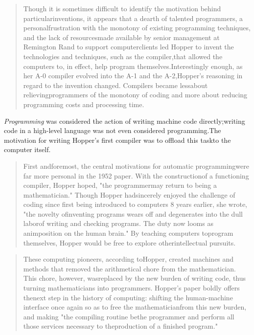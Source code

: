 \begin{quotation}
	Though it is sometimes difficult to identify the motivation behind
	particularinventions, it appears that a dearth of talented programmers, a
	personalfrustration with the monotony of existing programming techniques, and
	the lack of resourcesmade available by senior management at Remington Rand to
	support computerclients led Hopper to invent the technologies and techniques,
	such as the compiler,that allowed the computers to, in effect, help program
	themselves.Interestingly enough, as her A-0 compiler evolved into the A-1 and
	the A-2,Hopper's reasoning in regard to the invention changed. Compilers became
	lessabout relievingprogrammers of the monotony of coding and more about
	reducing programming costs and processing time.
\end{quotation}
\textit{Programming}
was considered the action of writing machine code directly;writing code in a
high-level language was not even considered programming.The motivation for
writing Hopper's first compiler was to offload this taskto the computer
itself.
\begin{quotation}
	First andforemost, the central motivations for automatic programmingwere far
	more personal in the 1952 paper. With the constructionof a functioning
	compiler, Hopper hoped, "the programmermay return to being a mathematician."
	Though Hopper hadsincerely enjoyed the challenge of coding since first being
	introduced to computers 8 years earlier, she wrote, "the novelty ofinventing
	programs wears off and degenerates into the dull laborof writing and checking
	programs. The duty now looms as animposition on the human brain." By teaching
	computers toprogram themselves, Hopper would be free to explore
	otherintellectual pursuits.
\end{quotation}
\begin{quotation}
	These computing pioneers, according toHopper, created machines and methods that
	removed the arithmetical chore from the mathematician. This chore, however,
	wasreplaced by the new burden of writing code, thus turning mathematicians into
	programmers. Hopper's paper boldly offers thenext step in the history of
	computing: shifting the human-machine interface once again so as to free the
	mathematicianfrom this new burden, and making "the compiling routine bethe
	programmer and perform all those services necessary to theproduction of a
	finished program."
\end{quotation}
